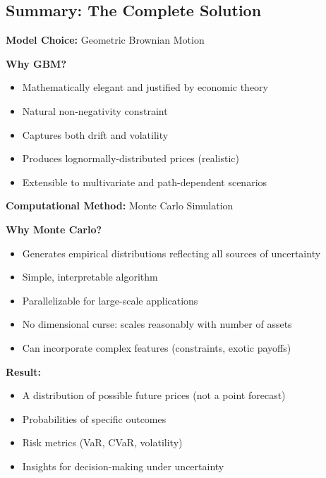 \documentclass[12pt,a4paper]{article}
\begin{document}
\subsection{Summary: The Complete Solution}

\begin{tcolorbox}[colback=green!10, colframe=green!50, title=The Complete Solution]

\textbf{Model Choice:} Geometric Brownian Motion

\textbf{Why GBM?}
\begin{itemize}
    \item Mathematically elegant and justified by economic theory
    \item Natural non-negativity constraint
    \item Captures both drift and volatility
    \item Produces lognormally-distributed prices (realistic)
    \item Extensible to multivariate and path-dependent scenarios
\end{itemize}

\textbf{Computational Method:} Monte Carlo Simulation

\textbf{Why Monte Carlo?}
\begin{itemize}
    \item Generates empirical distributions reflecting all sources of uncertainty
    \item Simple, interpretable algorithm
    \item Parallelizable for large-scale applications
    \item No dimensional curse: scales reasonably with number of assets
    \item Can incorporate complex features (constraints, exotic payoffs)
\end{itemize}

\textbf{Result:}
\begin{itemize}
    \item A distribution of possible future prices (not a point forecast)
    \item Probabilities of specific outcomes
    \item Risk metrics (VaR, CVaR, volatility)
    \item Insights for decision-making under uncertainty
\end{itemize}

\end{tcolorbox}

\newpage
\end{document}
